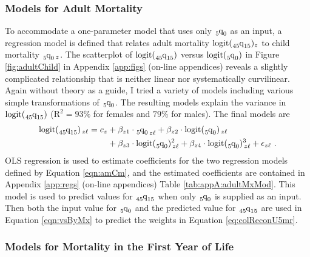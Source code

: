 \documentclass[11pt]{article}
\newcommand{\qf}{\tensor*[_5]{\mbox{q}}{_0}}
\newcommand{\qff}{\tensor*[_{45}]{\mbox{q}}{_{15}}}
\newcommand{\logit}{\mbox{logit}}
\begin{document}
\subsubsection{Models for Adult Mortality} \label{sec:modsAdultMx}

To accommodate a one-parameter model that uses only $\qf$ as an input, a regression model is defined that relates adult mortality $\logit(\qff)_{z}$ to child mortality $\qf_{\, z}$.  The scatterplot of $\logit(\qff)$ versus $\logit(\qf)$ in Figure \ref{fig:adultChild} in Appendix \ref{app:figs} (on-line appendices) reveals a slightly complicated relationship that is neither linear nor systematically curvilinear.  Again without theory as a guide, I tried a variety of models including various simple transformations of $\qf$.  The resulting models explain  the variance in $\logit(\qff)$ ($\mbox{R}^2 = 93\%$ for females and $79\%$ for males).  The final models are%
%
\begin{align}
\logit(\qff)_{\, z\ell} = c_z &+ \beta_{z1} \cdot {\qf}_{\, z\ell} + \beta_{z2} \cdot \logit(\qf)_{\, z\ell} \nonumber \\
&+ \beta_{z3} \cdot \logit(\qf)^2_{\, z\ell} + \beta_{z4} \cdot \logit(\qf)^3_{\, z\ell} + \epsilon_{z\ell} \ . \label{eqn:amCm}
\end{align}%
%
OLS regression is used to estimate coefficients for the two regression models defined by Equation \ref{eqn:amCm}, and the estimated coefficients are contained in Appendix \ref{app:regs} (on-line appendices) Table \ref{tab:appA:adultMxMod}.  This model is used to predict values for $\qff$ when only $\qf$ is supplied as an input.  Then both the input value for $\qf$ and the predicted value for $\qff$ are used in Equation \ref{eqn:vsByMx} to predict the weights in Equation \ref{eq:colReconU5mr}.   

\subsubsection{Models for Mortality in the First Year of Life} \label{sec:modsInfMx}
\end{document}
